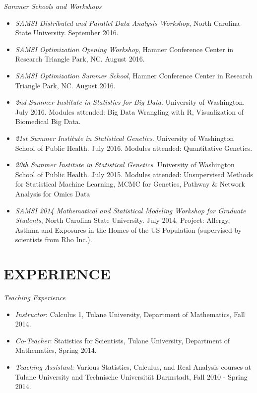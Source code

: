 \documentclass[margin]{res} %
\begin{document}
\begin{resume}
{\sl Summer Schools and Workshops} 
\begin{itemize}
\item {\it SAMSI Distributed and Parallel Data Analysis Workshop}, North Carolina State University. September 2016.
\item {\it SAMSI Optimization Opening Workshop}, Hamner Conference Center in Research Triangle Park, NC. August 2016.
\item {\it SAMSI Optimization Summer School}, Hamner Conference Center in Research Triangle Park, NC. August 2016.
\item {\it 2nd Summer Institute in Statistics for Big Data}. University of Washington. July 2016.
  Modules attended: Big Data Wrangling with R, Visualization of Biomedical Big Data.
\item {\it 21st Summer Institute in Statistical Genetics}. University of Washington School of Public Health. July 2016.
  Modules attended: Quantitative Genetics.
\item {\it 20th Summer Institute in Statistical Genetics}. University of Washington School of Public Health. July 2015.
  Modules attended: Unsupervised Methods for Statistical Machine Learning, MCMC for Genetics, Pathway \& Network Analysis for Omics Data
\item {\it SAMSI 2014 Mathematical and Statistical Modeling Workshop for Graduate Students}, North Carolina State University. July 2014.
  Project: Allergy, Asthma and Exposures in the Homes of the US Population (supervised by scientists from Rho Inc.).
\end{itemize} 
 
 
 
\section{EXPERIENCE}

{\sl Teaching Experience}
\begin{itemize} \itemsep -2pt %
\item \emph{Instructor}: Calculus 1, Tulane University, Department of Mathematics, Fall 2014.
\item \emph{Co-Teacher}: Statistics for Scientists, Tulane University, Department of Mathematics, Spring 2014.
\item \emph{Teaching Assistant}: Various Statistics, Calculus, and Real Analysis courses at Tulane University and Technische Universit\"{a}t Darmstadt, Fall 2010 - Spring 2014.
\end{itemize}


\end{resume}
\end{document}
